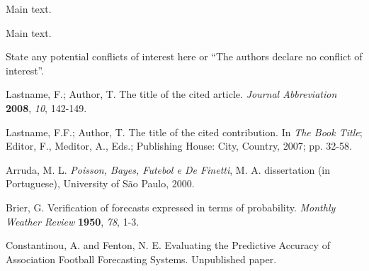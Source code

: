 \documentclass[journal,article,accept,moreauthors,pdftex,12pt,a4paper]{mdpi}
\begin{document}


Main text.



Main text.



State any potential conflicts of interest here or ``The authors declare no conflict of interest''. 


\makeatletter
\renewcommand\@biblabel[1]{#1. }
\makeatother

\begin{thebibliography}{999} %

Lastname, F.; Author, T. The title of the cited article. {\em Journal Abbreviation} {\bf 2008}, {\em 10}, 142-149.

Lastname, F.F.; Author, T. The title of the cited contribution. In {\em The Book Title}; Editor, F., Meditor, A., Eds.; Publishing House: City, Country, 2007; pp. 32-58.


Arruda, M. L. {\em Poisson, Bayes, Futebol e De Finetti}, M. A. dissertation (in Portuguese), University of S\~ao Paulo, 2000.

Brier, G. Verification of forecasts expressed in terms of probability. {\em Monthly Weather Review} {\bf 1950}, {\em 78}, 1-3.

Constantinou, A. and Fenton, N. E. Evaluating the Predictive Accuracy of Association Football Forecasting Systems. Unpublished paper.


\end{thebibliography}

%
%


%


%
\end{document}
